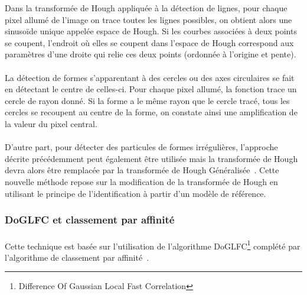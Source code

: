 \documentclass[12pt,a4paper]{report}
\begin{document}
\noindent
Dans la transformée de Hough\cite{HT:url} appliquée à la détection de lignes, pour chaque pixel allumé de l'image on trace toutes les lignes possibles, on obtient alors une sinusoïde unique appelée espace de Hough. Si les courbes associées à deux points se coupent, l'endroit où elles se coupent dans l'espace de Hough correspond aux paramètres d'une droite qui relie ces deux points (ordonnée à l'origine et pente).%

\paragraph*{}
La détection de formes s’apparentant à des cercles ou des axes circulaires se fait en détectant le centre de celles-ci.
Pour chaque pixel allumé, la fonction trace un cercle de rayon donné. Si la forme a le même rayon que le cercle tracé, tous les cercles se recoupent au centre de la forme, on constate ainsi une amplification de la valeur du pixel central.

\paragraph*{}
D'autre part, pour détecter des particules de formes irrégulières, l'approche décrite précédemment peut également \^etre utilisée mais la transformée de Hough devra alors \^etre remplacée par la transformée de Hough Généralisée~\cite{GHT:url}.
Cette nouvelle méthode repose sur la modification de la transformée de Hough en utilisant le principe de l'identification à partir d'un modèle de référence.

\subsubsection{DoGLFC et classement par affinité}

\paragraph*{}
Cette technique est basée sur l'utilisation de l'algorithme DoGLFC\footnote{Difference Of Gaussian Local Fast Correlation} complété par l'algorithme de classement par affinité~\cite{DoGAff:article}.
\end{document}
